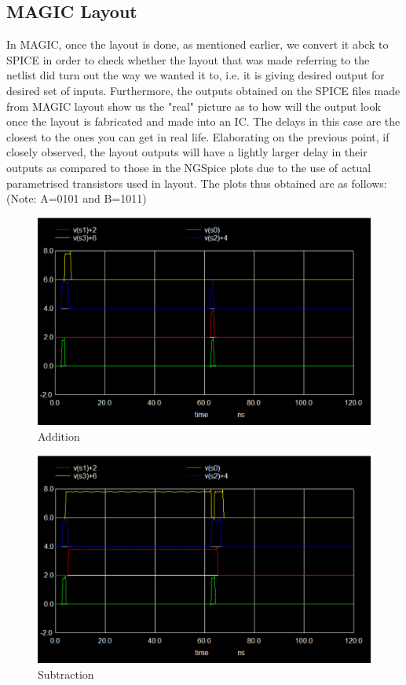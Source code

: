\documentclass[a4paper, titlepage]{article}
\begin{document}
\subsection{MAGIC Layout}
In MAGIC, once the layout is done, as mentioned earlier, we convert it abck to SPICE in order to check whether the layout 
that was made referring to the netlist did turn out the way we wanted it to, i.e. it is giving desired output for desired 
set of inputs. \newline 
Furthermore, the outputs obtained on the SPICE files made from MAGIC layout show us the "real" picture as to how will the 
output look once the layout is fabricated and made into an IC. The delays in this case are the closest to the ones you 
can get in real life.\newline 
Elaborating on the previous point, if closely observed, the layout outputs will have a lightly larger delay in their outputs
as compared to those in the NGSpice plots due to the use of actual parametrised transistors used in layout.
The plots thus obtained are as follows: (Note: A=0101 and B=1011)
\begin{figure}[htp!]
    \centering
    \hypertarget{MA}{\includegraphics[scale = 0.5]{4_bit_AS_00.png}}
    \caption{Addition}
    \label{fig:fig17}
\end{figure}
\begin{figure}[htp!]
    \centering
    \hypertarget{MS}{\includegraphics[scale = 0.5]{4_bit_AS_01.png}}
    \caption{Subtraction}
    \label{fig:fig18}
\end{figure}
\end{document}
